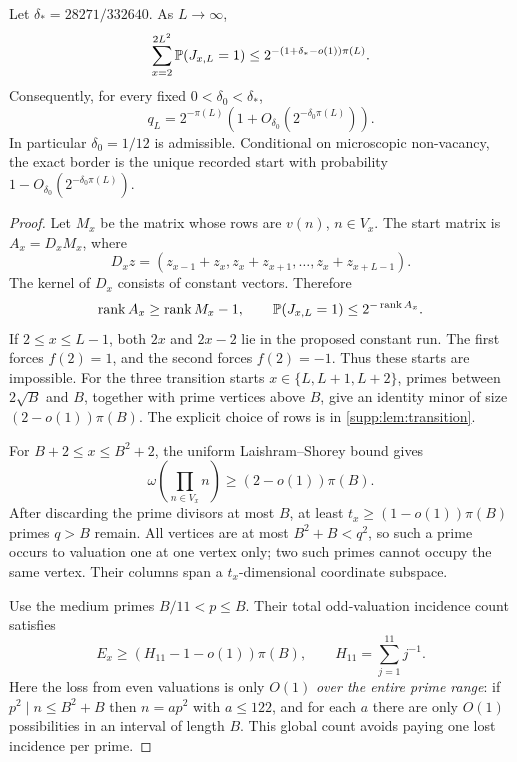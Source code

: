 \begin{theorem}\label{thm:boundary}
Let $\delta_*=28271/332640$. As $L\to\infty$,
\begin{equation}\label{eq:interior-micro}
 \sum_{x=2}^{2L^2}\mathbb P(J_{x,L}=1)
       \le2^{-(1+\delta_*-o(1))\pi(L)}.
\end{equation}
Consequently, for every fixed $0<\delta_0<\delta_*$,
\begin{equation}\label{eq:boundary-asymptotic}
 q_L=2^{-\pi(L)}(1+O_{\delta_0}(2^{-\delta_0\pi(L)})).
\end{equation}
In particular $\delta_0=1/12$ is admissible. Conditional on microscopic
non-vacancy, the exact border is the unique recorded start with probability
$1-O_{\delta_0}(2^{-\delta_0\pi(L)})$.
\end{theorem}
\begin{proof}
Let $M_x$ be the matrix whose rows are $v(n)$, $n\in V_x$.
The start matrix is $A_x=D_xM_x$, where
\[
 D_xz=(z_{x-1}+z_x,z_x+z_{x+1},\ldots,z_x+z_{x+L-1}).
\]
The kernel of $D_x$ consists of constant vectors. Therefore
\begin{equation}\label{eq:boundary-rank-drop}
 \operatorname{rank} A_x\ge\operatorname{rank} M_x-1,\qquad
 \mathbb P(J_{x,L}=1)\le2^{-\operatorname{rank} A_x}.
\end{equation}
If $2\le x\le L-1$, both $2x$ and $2x-2$ lie in the proposed constant
run. The first forces $f(2)=1$, and the second forces $f(2)=-1$.
Thus these starts are impossible. For the three transition starts
$x\in\{L,L+1,L+2\}$, primes between $2\sqrt B$ and $B$, together
with prime vertices above $B$, give an identity minor of size
$(2-o(1))\pi(B)$. The explicit choice of rows is in
\cref{supp:lem:transition}.

For $B+2\le x\le B^2+2$, the uniform Laishram--Shorey bound gives
\[
 \omega\left(\prod_{n\in V_x}n\right)\ge(2-o(1))\pi(B).
\]
After discarding the prime divisors at most $B$, at least
$t_x\ge(1-o(1))\pi(B)$ primes $q>B$ remain. All vertices are at most
$B^2+B<q^2$, so such a prime occurs to valuation one at one vertex only;
two such primes cannot occupy the same vertex. Their columns span a
$t_x$-dimensional coordinate subspace.

Use the medium primes $B/11<p\le B$. Their total odd-valuation incidence
count satisfies
\begin{equation}\label{eq:medium-incidences}
 E_x\ge(H_{11}-1-o(1))\pi(B),\qquad H_{11}=\sum_{j=1}^{11}j^{-1}.
\end{equation}
Here the loss from even valuations is only $O(1)$ \emph{over the entire
prime range}: if $p^2\mid n\le B^2+B$ then $n=ap^2$ with $a\le122$,
and for each $a$ there are only $O(1)$ possibilities in an interval of
length $B$. This global count avoids paying one lost incidence per prime.


\end{proof}
